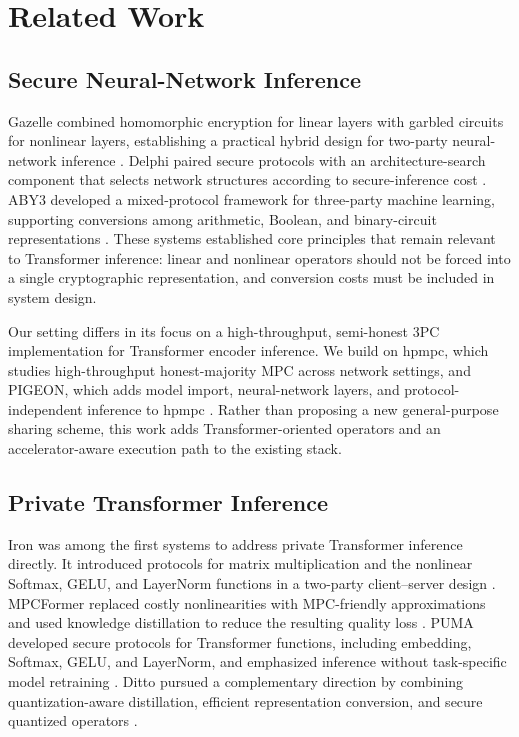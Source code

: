 \section{Related Work}
\label{sec:related}

\subsection{Secure Neural-Network Inference}
Gazelle combined homomorphic encryption for linear layers with garbled circuits for nonlinear layers, establishing a practical hybrid design for two-party neural-network inference \cite{juvekar2018gazelle}. Delphi paired secure protocols with an architecture-search component that selects network structures according to secure-inference cost \cite{mishra2020delphi}. ABY3 developed a mixed-protocol framework for three-party machine learning, supporting conversions among arithmetic, Boolean, and binary-circuit representations \cite{mohassel2018aby3}. These systems established core principles that remain relevant to Transformer inference: linear and nonlinear operators should not be forced into a single cryptographic representation, and conversion costs must be included in system design.

Our setting differs in its focus on a high-throughput, semi-honest 3PC implementation for Transformer encoder inference. We build on hpmpc, which studies high-throughput honest-majority MPC across network settings, and PIGEON, which adds model import, neural-network layers, and protocol-independent inference to hpmpc \cite{harth2025hpmpc,harth2025pigeon}. Rather than proposing a new general-purpose sharing scheme, this work adds Transformer-oriented operators and an accelerator-aware execution path to the existing stack.

\subsection{Private Transformer Inference}
Iron was among the first systems to address private Transformer inference directly. It introduced protocols for matrix multiplication and the nonlinear Softmax, GELU, and LayerNorm functions in a two-party client--server design \cite{hao2022iron}. MPCFormer replaced costly nonlinearities with MPC-friendly approximations and used knowledge distillation to reduce the resulting quality loss \cite{li2023mpcformer}. PUMA developed secure protocols for Transformer functions, including embedding, Softmax, GELU, and LayerNorm, and emphasized inference without task-specific model retraining \cite{dong2023puma}. Ditto pursued a complementary direction by combining quantization-aware distillation, efficient representation conversion, and secure quantized operators \cite{wu2024ditto}.


